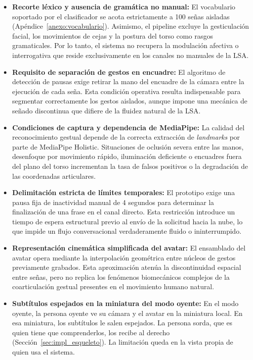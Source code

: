 \begin{itemize}
    \item \textbf{Recorte léxico y ausencia de gramática no manual:}
    El vocabulario soportado por el clasificador se acota estrictamente a 100 señas aisladas (Apéndice~\ref{anexo:vocabulario}). Asimismo, el pipeline excluye la gesticulación facial, los movimientos de cejas y la postura del torso como rasgos gramaticales. Por lo tanto, el sistema no recupera la modulación afectiva o interrogativa que reside exclusivamente en los canales no manuales de la LSA.

    \item \textbf{Requisito de separación de gestos en encuadre:}
    El algoritmo de detección de pausas exige retirar la mano del encuadre de la cámara entre la ejecución de cada seña. Esta condición operativa resulta indispensable para segmentar correctamente los gestos aislados, aunque impone una mecánica de señado discontinua que difiere de la fluidez natural de la LSA.

    \item \textbf{Condiciones de captura y dependencia de MediaPipe:}
    La calidad del reconocimiento gestual depende de la correcta extracción de \textit{landmarks} por parte de MediaPipe Holistic. Situaciones de oclusión severa entre las manos, desenfoque por movimiento rápido, iluminación deficiente o encuadres fuera del plano del torso incrementan la tasa de falsos positivos o la degradación de las coordenadas articulares.

    \item \textbf{Delimitación estricta de límites temporales:}
    El prototipo exige una pausa fija de inactividad manual de 4 segundos para determinar la finalización de una frase en el canal directo. Esta restricción introduce un tiempo de espera estructural previo al envío de la solicitud hacia la nube, lo que impide un flujo conversacional verdaderamente fluido o ininterrumpido.

    \item \textbf{Representación cinemática simplificada del avatar:}
    El ensamblado del avatar opera mediante la interpolación geométrica entre núcleos de gestos previamente grabados. Esta aproximación atenúa la discontinuidad espacial entre señas, pero no replica los fenómenos biomecánicos complejos de la coarticulación gestual presentes en el movimiento humano natural.

    \item \textbf{Subtítulos espejados en la miniatura del modo oyente:}
    En el modo oyente, la persona oyente ve su cámara y el avatar en la miniatura local. En esa miniatura, los subtítulos le salen espejados. La persona sorda, que es quien tiene que comprenderlos, los recibe al derecho (Sección~\ref{sec:impl_esqueleto}). La limitación queda en la vista propia de quien usa el sistema.

    

\end{itemize}

